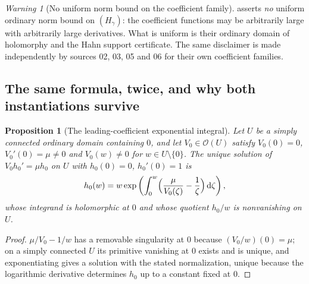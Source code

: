 \documentclass[11pt,letterpaper]{article}
\newtheorem{proposition}[proposition]{Proposition}
\theoremstyle{definition}
\theoremstyle{remark}
\newtheorem{warning}[warning]{Warning}
\newcommand{\OO}{\mathcal O}
\newcommand{\dd}{\,\mathrm d}
\numberwithin{equation}{section}
\begin{document}
\begin{warning}[No uniform norm bound on the coefficient family]
\label{dyn:warn:nouniform}
 asserts \emph{no} uniform ordinary norm bound on
$(H_\gamma)$: the coefficient functions may be arbitrarily large with
arbitrarily large derivatives. What is uniform is their ordinary domain of
holomorphy and the Hahn support certificate. The same disclaimer is made
independently by sources 02, 03, 05 and 06 for their own coefficient
families.
\end{warning}

\subsection{The same formula, twice, and why both instantiations survive}
\label{dyn:subsec:sameformula}

\begin{proposition}[The leading-coefficient exponential integral]
\label{dyn:prop:leading}
Let $U$ be a simply connected ordinary domain containing $0$, and let
$V_0\in\OO(U)$ satisfy $V_0(0)=0$, $V_0'(0)=\mu\ne0$ and $V_0(w)\ne0$ for
$w\in U\setminus\{0\}$. The unique solution of $V_0h_0'=\mu h_0$ on $U$
with $h_0(0)=0$, $h_0'(0)=1$ is
\begin{equation}\label{dyn:eq:leadingH}
 h_0(w)=w\exp\left(\int_0^{w}
 \Bigl(\frac{\mu}{V_0(\zeta)}-\frac1\zeta\Bigr)\dd\zeta\right),
\end{equation}
whose integrand is holomorphic at $0$ and whose quotient $h_0/w$ is
nonvanishing on $U$.
\end{proposition}
\begin{proof}
$\mu/V_0-1/w$ has a removable singularity at $0$ because
$(V_0/w)(0)=\mu$; on a simply connected $U$ its primitive vanishing at $0$
exists and is unique, and exponentiating gives a solution with the stated
normalization, unique because the logarithmic derivative determines $h_0$
up to a constant fixed at $0$.
\end{proof}
\end{document}
